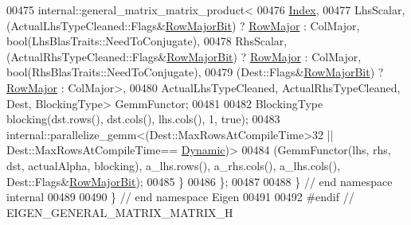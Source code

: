 \begin{DoxyCode}
00475       internal::general\_matrix\_matrix\_product<
00476         \hyperlink{namespace_eigen_a62e77e0933482dafde8fe197d9a2cfde}{Index},
00477         LhsScalar, (ActualLhsTypeCleaned::Flags&\hyperlink{group__flags_gae4f56c2a60bbe4bd2e44c5b19cbe8762}{RowMajorBit}) ? 
      \hyperlink{group__enums_ggaacded1a18ae58b0f554751f6cdf9eb13acfcde9cd8677c5f7caf6bd603666aae3}{RowMajor} : ColMajor, \textcolor{keywordtype}{bool}(LhsBlasTraits::NeedToConjugate),
00478         RhsScalar, (ActualRhsTypeCleaned::Flags&\hyperlink{group__flags_gae4f56c2a60bbe4bd2e44c5b19cbe8762}{RowMajorBit}) ? 
      \hyperlink{group__enums_ggaacded1a18ae58b0f554751f6cdf9eb13acfcde9cd8677c5f7caf6bd603666aae3}{RowMajor} : ColMajor, \textcolor{keywordtype}{bool}(RhsBlasTraits::NeedToConjugate),
00479         (Dest::Flags&\hyperlink{group__flags_gae4f56c2a60bbe4bd2e44c5b19cbe8762}{RowMajorBit}) ? \hyperlink{group__enums_ggaacded1a18ae58b0f554751f6cdf9eb13acfcde9cd8677c5f7caf6bd603666aae3}{RowMajor} : ColMajor>,
00480       ActualLhsTypeCleaned, ActualRhsTypeCleaned, Dest, BlockingType> GemmFunctor;
00481 
00482     BlockingType blocking(dst.rows(), dst.cols(), lhs.cols(), 1, \textcolor{keyword}{true});
00483     internal::parallelize\_gemm<(Dest::MaxRowsAtCompileTime>32 || Dest::MaxRowsAtCompileTime==
      \hyperlink{namespace_eigen_ad81fa7195215a0ce30017dfac309f0b2}{Dynamic})>
00484         (GemmFunctor(lhs, rhs, dst, actualAlpha, blocking), a\_lhs.rows(), a\_rhs.cols(), a\_lhs.cols(), 
      Dest::Flags&\hyperlink{group__flags_gae4f56c2a60bbe4bd2e44c5b19cbe8762}{RowMajorBit});
00485   \}
00486 \};
00487 
00488 \} \textcolor{comment}{// end namespace internal}
00489 
00490 \} \textcolor{comment}{// end namespace Eigen}
00491 
00492 \textcolor{preprocessor}{#endif // EIGEN\_GENERAL\_MATRIX\_MATRIX\_H}
\end{DoxyCode}
